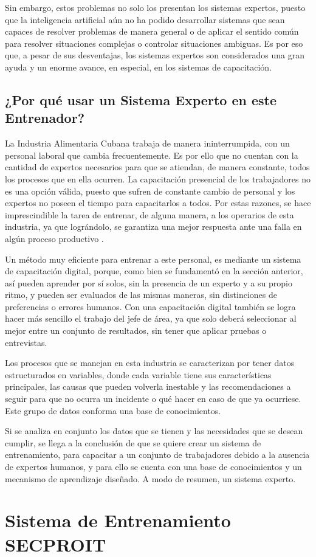 Sin embargo, estos problemas no solo los presentan los sistemas expertos, puesto que la inteligencia artificial aún no ha podido desarrollar sistemas que
sean capaces de resolver problemas de manera general o de aplicar el sentido común para resolver situaciones complejas o controlar situaciones ambiguas. Es por eso que, a pesar de sus desventajas, los sistemas expertos son considerados una gran ayuda y un enorme avance, en especial, en los sistemas de capacitación.

\subsection{¿Por qué usar un Sistema Experto en este Entrenador?}
La Industria Alimentaria Cubana trabaja de manera ininterrumpida, con un personal laboral que cambia frecuentemente. Es por ello que no cuentan con la cantidad de expertos necesarios para que se atiendan, de manera constante, todos los procesos que en ella ocurren. La capacitación presencial de los trabajadores no es una opción válida, puesto que sufren de constante cambio de personal y los expertos no poseen el tiempo para capacitarlos a todos. Por estas razones, se hace imprescindible la tarea de entrenar, de alguna manera, a los operarios de esta industria, ya que lográndolo, se garantiza una mejor respuesta ante una falla en algún proceso productivo \cite{gestorBases}.

Un método muy eficiente para entrenar a este personal, es mediante un sistema de capacitación digital, porque, como bien se fundamentó en la sección anterior, así pueden aprender por sí solos, sin la presencia de un experto y a su propio ritmo, y pueden ser evaluados de las mismas maneras, sin distinciones de preferencias o errores humanos. Con una capacitación digital también se logra hacer más sencillo el trabajo del jefe de área, ya que solo deberá seleccionar al mejor entre un conjunto de resultados, sin tener que aplicar pruebas o entrevistas.

Los procesos que se manejan en esta industria se caracterizan por tener datos estructurados en variables, donde cada variable tiene sus características principales, las causas que pueden volverla inestable y las recomendaciones a seguir para que no ocurra un incidente o qué hacer en caso de que ya ocurriese. Este grupo de datos conforma una base de conocimientos.

Si se analiza en conjunto los datos que se tienen y las necesidades que se desean cumplir, se llega a la conclusión de que se quiere crear un sistema de entrenamiento, para capacitar a un conjunto de trabajadores debido a la ausencia de expertos humanos, y para ello se cuenta con una base de conocimientos y un mecanismo de aprendizaje diseñado. A modo de resumen, un sistema experto.


\section{Sistema de Entrenamiento SECPROIT}
